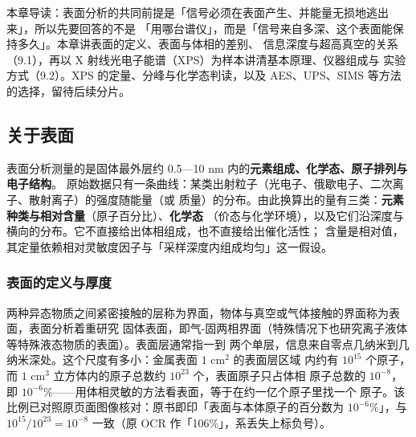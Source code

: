 %
{本章导读：表面分析的共同前提是「信号必须在表面产生、并能量无损地逃出来」，所以先要回答的不是
「用哪台谱仪」，而是「信号来自多深、这个表面能保持多久」。本章讲表面的定义、表面与体相的差别、
信息深度与超高真空的关系（9.1），再以 X 射线光电子能谱（XPS）为样本讲清基本原理、仪器组成与
实验方式（9.2）。XPS 的定量、分峰与化学态判读，以及 AES、UPS、SIMS 等方法的选择，留待后续分片。}
\label{ch:09}


\subsection{关于表面}

\begin{probout}
表面分析测量的是固体最外层约 0.5—10 nm 内的\textbf{元素组成、化学态、原子排列与电子结构}。
原始数据只有一条曲线：某类出射粒子（光电子、俄歇电子、二次离子、散射离子）的强度随能量（或
质量）的分布。由此换算出的量有三类：\textbf{元素种类与相对含量}（原子百分比）、\textbf{化学态}
（价态与化学环境），以及它们沿深度与横向的分布。它不直接给出体相组成，也不直接给出催化活性；
含量是相对值，其定量依赖相对灵敏度因子与「采样深度内组成均匀」这一假设。
\end{probout}

\subsubsection{表面的定义与厚度}

两种异态物质之间紧密接触的层称为界面，物体与真空或气体接触的界面称为表面，表面分析着重研究
固体表面，即气-固两相界面（特殊情况下也研究离子液体等特殊液态物质的表面）。表面层通常指一到
两个单层，信息来自零点几纳米到几纳米深处。这个尺度有多小：金属表面 $1$ cm$^{2}$ 的表面层区域
内约有 $10^{15}$ 个原子，而 $1$ cm$^{3}$ 立方体内的原子总数约 $10^{23}$ 个，表面原子只占体相
原子总数的 $10^{-8}$，即 $10^{-6}\%$——用体相灵敏的方法看表面，等于在约一亿个原子里找一个
原子。该比例已对照原页面图像核对：原书即印「表面与本体原子的百分数为 $10^{-6}\%$」，与
$10^{15}/10^{23}=10^{-8}$ 一致（原 OCR 作「106\%」，系丢失上标负号）。

